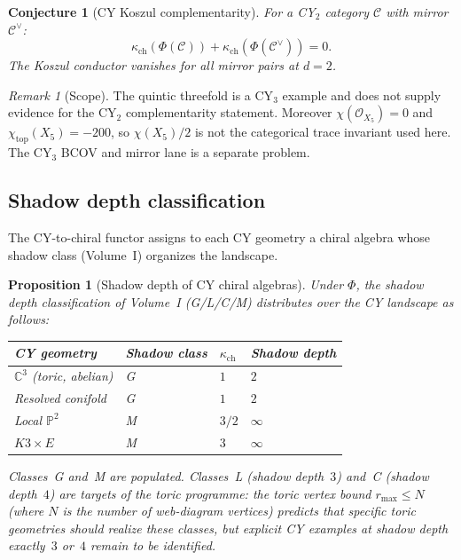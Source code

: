 \documentclass[11pt]{article}
\theoremstyle{plain}
\newtheorem{proposition}[theorem]{Proposition}
\newtheorem{conjecture}[theorem]{Conjecture}
\theoremstyle{definition}
\theoremstyle{remark}
\newtheorem{remark}[theorem]{Remark}
\newcommand{\cC}{\mathcal{C}}
\newcommand{\cO}{\mathcal{O}}
\newcommand{\bC}{\mathbb{C}}
\newcommand{\bP}{\mathbb{P}}
\begin{document}
\begin{conjecture}[CY Koszul complementarity]
\label{conj:v3-st-cy-koszul-complementarity}
For a CY$_2$ category $\cC$ with mirror $\cC^\vee$:
\[
 \kappa_{\mathrm{ch}}(\Phi(\cC)) + \kappa_{\mathrm{ch}}
 (\Phi(\cC^\vee)) = 0.
\]
The Koszul conductor vanishes for all mirror pairs at $d = 2$.
\end{conjecture}

\begin{remark}[Scope]
\label{rem:v3-st-cy-complement-evidence}
The quintic threefold is a CY$_3$ example and does not supply
evidence for the CY$_2$ complementarity statement.  Moreover
$\chi(\cO_{X_5})=0$ and $\chi_{\mathrm{top}}(X_5)=-200$, so
$\chi(X_5)/2$ is not the categorical trace invariant used here.
The CY$_3$ BCOV and mirror lane is a separate problem.
\end{remark}

\subsection{Shadow depth classification}

The CY-to-chiral functor assigns to each CY geometry a chiral
algebra whose shadow class (Volume~I) organizes the landscape.

\begin{proposition}[Shadow depth of CY chiral algebras]
\label{prop:v3-st-cy-shadow-depth}
Under $\Phi$, the shadow depth classification of Volume~I
(G/L/C/M) distributes over the CY landscape as follows:
\begin{center}
\renewcommand{\arraystretch}{1.3}
\small
\begin{tabular}{llll}
 \toprule
 CY geometry & Shadow class & $\kappa_{\mathrm{ch}}$ &
 Shadow depth \\
 \midrule
 $\bC^3$ (toric, abelian) & G & $1$ & $2$ \\
 Resolved conifold & G & $1$ & $2$ \\
 Local $\bP^2$ & M & $3/2$ & $\infty$ \\
 $K3 \times E$ & M & $3$ & $\infty$ \\
 \bottomrule
\end{tabular}
\end{center}
Classes~G and~M are populated.  Classes~L (shadow depth~$3$) and~C
(shadow depth~$4$) are targets of the toric programme: the toric
vertex bound $r_{\max} \leq N$ (where $N$ is the number of
web-diagram vertices) predicts that specific toric geometries
should realize these classes, but explicit CY examples at shadow
depth exactly~$3$ or~$4$ remain to be identified.
\end{proposition}
\end{document}
